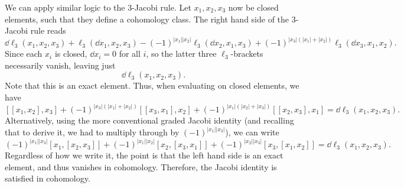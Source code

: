 We can apply similar logic to the 3-Jacobi rule. Let $x_1,x_2,x_3$ now be closed elements, such that they define a cohomology class. The right hand side of the 3-Jacobi rule reads
\[
	\dd \ell _3(x_1,x_2,x_3) + \ell _3(\dd x_1,x_2,x_3) - (-1)^{\left| x_1 \right| \left| x_2 \right| } \ell _3(\dd x_2,x_1,x_3) + (-1)^{\left| x_3 \right| (\left| x_1 \right| +\left| x_2 \right| )} \ell _3(\dd x_3,x_1,x_2)
.\]
Since each $x_i$ is closed, $\dd x_i=0$ for all $i$, so the latter three $\ell _3$-brackets necessarily vanish, leaving just
\[
	\dd \ell _3(x_1,x_2,x_3)
.\]
Note that this is an exact element. Thus, when evaluating on closed elements, we have
\[
	[[x_1,x_2],x_3] + (-1)^{\left| x_3 \right|(\left| x_1 \right| +\left| x_2 \right| ) } [[x_3,x_1],x_2] + (-1)^{\left| x_1 \right| (\left| x_2 \right| +\left| x_3 \right| )} [[x_2,x_3],x_1] = \dd \ell _3(x_1,x_2,x_3)
.\]
Alternatively, using the more conventional graded Jacobi identity (and recalling that to derive it, we had to multiply through by $(-1)^{\left| x_1 \right| \left| x_3 \right| } $), we can write
\[
	(-1)^{\left| x_1 \right| \left| x_3 \right| } [x_1,[x_2,x_3]]+(-1)^{\left| x_1 \right| \left| x_2 \right| } [x_2,[x_3,x_1]]+(-1)^{\left| x_2 \right| \left| x_3 \right| } [x_3,[x_1,x_2]]=\dd \ell _3(x_1,x_2,x_3)
.\]
Regardless of how we write it, the point is that the left hand side is an exact element, and thus vanishes in cohomology. Therefore, the Jacobi identity is satisfied in cohomology.

